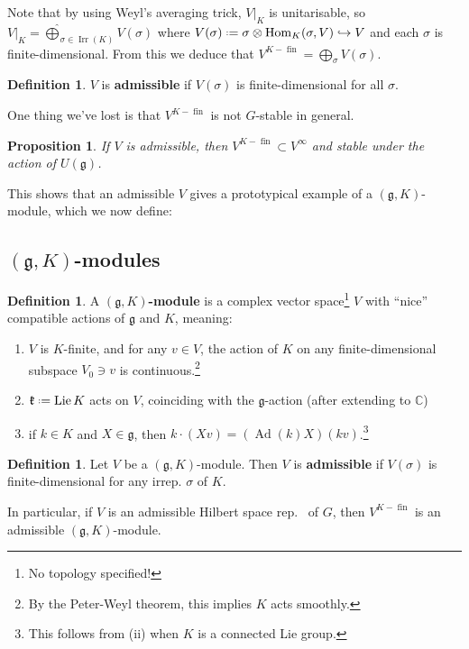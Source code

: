 \documentclass[11pt]{report}
\let\mf\mathfrak
\newcommand{\1}{\mathbbm 1}
\newcommand{\g}{\mf g}
\newcommand{\C}{\mathbb{C}}
\newcommand*{\defeq}{\mathrel{\vcenter{\baselineskip0.5ex \lineskiplimit0pt
      \hbox{\scriptsize.}\hbox{\scriptsize.}}}%
  =}
\DeclareMathOperator{\fin}{fin}
\DeclareMathOperator{\Irr}{Irr}
\DeclareMathOperator{\Ad}{Ad}
\DeclareMathOperator{\Lie}{Lie}
\DeclareMathOperator{\Hom}{Hom}
\theoremstyle{plain}
\newcounter{ex}
\newtheorem{prop}[thm]{Proposition}
\theoremstyle{definition}
\newtheorem{mydef}[thm]{Definition}
\theoremstyle{remark}
\numberwithin{equation}{section}
\begin{document}
Note that by using Weyl's averaging trick, $V|_{K}$ is unitarisable,
so $V|_{K} = \hat\bigoplus_{\sigma \in \Irr(K)}V(\sigma)$ where
$V(\sigma) \defeq \sigma \otimes \Hom_{K}(\sigma,V) \hookrightarrow V$ and each
$\sigma$ is finite-dimensional. From this we deduce that $V^{K-\fin} =
\bigoplus_{\sigma}V(\sigma)$. 

\begin{mydef}
  $V$ is \textbf{admissible} if $V(\sigma)$ is finite-dimensional for all
  $\sigma$. 
\end{mydef}
One thing we've lost is that $V^{K-\fin}$ is not $G$-stable in
general.

\begin{prop}
  If $V$ is admissible, then $V^{K-\fin} \subset V^{\infty}$ and stable under the
  action of $U(\g)$. 
\end{prop}
This shows that an admissible $V$ gives a prototypical example of a
$(\g,K)$-module, which we now define:

\subsection{$(\g,K)$-modules}
\label{sec:g-k-modules}

\begin{mydef}
  A \textbf{$(\g,K)$-module} is a complex vector space\footnote{No
    topology specified!} $V$ with 
  ``nice'' compatible actions of $\g$ and $K$, meaning:
  \begin{enumerate}
  \item $V$ is $K$-finite, and for any $v \in V$, the action of $K$ on any
    finite-dimensional subspace $V_{0} \ni v$ is continuous.\footnote{By
    the Peter-Weyl theorem, this implies $K$ acts smoothly.}
  \item $\mf k \defeq \Lie K $ acts on $V$, coinciding with the
    $\g$-action (after extending to $\C$)
  \item if $k \in K$ and $X \in \mf g$, then $k\cdot (Xv) =
    (\Ad(k)X)(kv)$.\footnote{This follows from (ii) when $K$ is a
      connected Lie group.}
  \end{enumerate}
\end{mydef}

\begin{mydef}
  Let $V$ be a $(\g,K)$-module. Then $V$ is
  \textbf{admissible} if $V(\sigma)$ is finite-dimensional for any irrep. $\sigma$ of $K$.
\end{mydef}

In particular, if $V$ is an admissible Hilbert space rep.~ of $G$,
then $V^{K-\fin}$ is an admissible $(\g,K)$-module.
\end{document}
